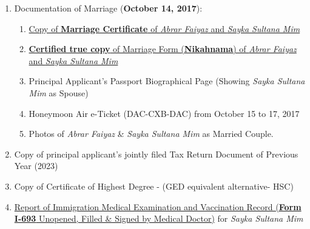 \begin{enumerate}[label=\textbf{ Exhibit-\arabic*},start=15]
    \item Documentation of Marriage (\textbf{October 14, 2017}):
    \begin{enumerate}[label=\roman*.]
        \item \hyperref[exhibit12a]{Copy of \textbf{Marriage Certificate} of \textit{Abrar Faiyaz} and \textit{Sayka Sultana Mim}}
        \item \hyperref[exhibit12b]{\textbf{Certified true copy} of Marriage Form (\textbf{Nikahnama}) of \textit{Abrar Faiyaz} and \textit{Sayka Sultana Mim}}
        \item Principal Applicant's Passport Biographical Page (Showing \textit{Sayka Sultana Mim} as Spouse)
        \item Honeymoon Air e-Ticket (DAC-CXB-DAC) from October 15 to 17, 2017
        \item Photos of \textit{Abrar Faiyaz} \& \textit{Sayka Sultana Mim} as Married Couple.
    \end{enumerate}

    \item Copy of principal applicant's jointly filed Tax Return Document of Previous Year (2023)

    \item Copy of Certificate of Highest Degree - (GED equivalent alternative- HSC)
    \item \hyperref[exhibit14]{Report of Immigration Medical Examination and Vaccination Record (\textbf{Form I-693} Unopened, Filled \& Signed by Medical Doctor)} for \textit{Sayka Sultana Mim}
\end{enumerate}